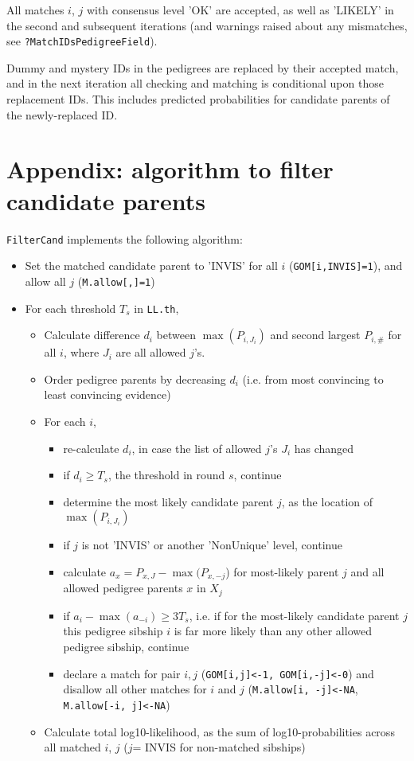 \documentclass[a4paper, 12pt]{article}
\begin{document}
All matches $i$, $j$ with consensus level 'OK' are accepted, as well as 'LIKELY' in the second and subsequent iterations (and warnings raised about any mismatches, see \verb+?MatchIDsPedigreeField+).

Dummy and mystery IDs in the pedigrees are replaced by their accepted match, and in the next iteration all checking and matching is conditional upon those replacement IDs. This includes predicted probabilities for candidate parents of the newly-replaced ID.

\section*{Appendix: algorithm to filter candidate parents}

\verb+FilterCand+ implements the following algorithm:

\begin{itemize}
	\item Set the matched candidate parent to 'INVIS' for all $i$ (\verb+GOM[i,INVIS]=1+), and allow all $j$ (\verb+M.allow[,]=1+)
	\item For each threshold $T_s$ in \verb+LL.th+,
		\begin{itemize}
		\item Calculate difference $d_i$ between $\max(P_{i,J_i})$ and second largest $P_{i,\#}$ for all $i$, where $J_i$ are all allowed $j$'s.
		\item Order pedigree parents by decreasing $d_i$ (i.e. from most convincing to least convincing evidence)
		\item For each $i$,
		\begin{itemize}
			\item re-calculate $d_i$, in case the list of allowed $j$'s $J_i$ has changed
			\item if $d_i \geq T_s$, the threshold in round $s$, continue
			\item determine the most likely candidate parent $j$, as the location of $\max(P_{i,J_i})$
			\item if $j$ is not 'INVIS' or another 'NonUnique' level, continue
			\item calculate $a_x = P_{x,J} - \max(P_{x,-j}$) for most-likely parent $j$ and all allowed pedigree parents $x$ in $X_j$
			\item if $a_i - \max(a_{-i}) \geq 3T_s$, i.e. if for the most-likely candidate parent $j$ this pedigree sibship $i$ is far more likely than any other allowed pedigree sibship, continue
			\item declare a match for pair $i, j$ (\verb+GOM[i,j]<-1, GOM[i,-j]<-0+) and disallow all other matches for $i$ and $j$ (\verb+M.allow[i, -j]<-NA+, \verb+M.allow[-i, j]<-NA+)
		\end{itemize}
		\item Calculate total log10-likelihood, as the sum of log10-probabilities across all matched $i$, $j$ ($j$= INVIS for non-matched sibships)
	\end{itemize}
\end{itemize}
\end{document}
